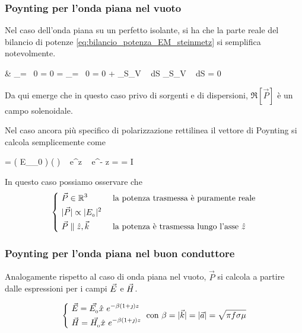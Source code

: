 	\subsubsection{Poynting per l'onda piana nel vuoto}

		Nel caso dell'onda piana su un perfetto isolante, si ha che la parte reale del bilancio di potenze \ref{eq:bilancio_potenza_EM_steinmetz} si semplifica notevolmente.

		\begin{esp} \label{eq:bilancio_potenza_EM_steinmetz}
			& _{= \, 0  \jt = 0}
				= _{= \, 0  \sigma = 0}
				+ \int_{S_V} \Re[\vec{P}] \cdot {} ~ dS
				\implies \int_{S_V} \Re[\vec{P}] \cdot {} ~ dS = 0
		\end{esp}

		Da qui emerge che in questo caso privo di sorgenti e di dispersioni, $\Re[\vec{P}]$ è un campo solenoidale.

		Nel caso ancora più specifico di polarizzazione rettilinea il vettore di Poynting si calcola semplicemente come
		\begin{esp}
				=  \left( E_{_{0}}  \right) \times \left(   \right)
					~ e^{\jmath \beta z} ~ e^{- \jmath \beta z}
				= \frac{|E_{_{0}}|^2}{2\eta} \hat{z}
				= I \hat{z}
		\end{esp}

		In questo caso possiamo osservare che
		\begin{equation}
			\begin{dcases}
				~ \vec{P} \in \mathbb{R}^3 & \text{ la potenza trasmessa è puramente reale} \\
				~ |\vec{P}| \propto |E_{_{0}}|^2 \\
				~ \vec{P} \parallel \hat{z}, \vec{k} & \text{ la potenza è trasmessa lungo l'asse } \hat{z}
			\end{dcases}
		\end{equation}

	\subsubsection{Poynting per l'onda piana nel buon conduttore}
		Analogamente rispetto al caso di onda piana nel vuoto, $\vec{P}$ si calcola a partire dalle espressioni per i campi $\vec{E}$ e $\vec{H}$.

		\begin{equation}
			\begin{dcases}
				~ \vec{E} = \vec{E_{_{0}}} \hat{x} ~ e^{-\beta(1+\jmath) z} \\
				~ \vec{H} = \vec{H_{_{0}}} \hat{x} ~ e^{-\beta(1+\jmath) z} \\
			\end{dcases}
			\text{ con } \beta = |\vec{k}| = |\vec{a}| = \sqrt{\pi f \sigma \mu}
		\end{equation}

